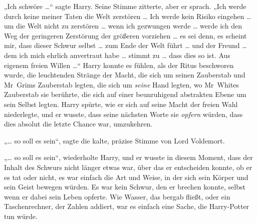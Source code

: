 „Ich schwöre …“ sagte Harry.
Seine Stimme zitterte, aber er sprach.
„Ich werde durch keine meiner Taten die Welt zerstören … Ich werde kein Risiko eingehen … um die Welt nicht zu zerstören … wenn ich gezwungen werde … werde ich den Weg der geringeren Zerstörung der größeren vorziehen … es sei denn, es scheint mir, dass dieser Schwur selbst … zum Ende der Welt führt … und der Freund … dem ich mich ehrlich anvertraut habe … stimmt zu … dass dies so ist. Aus eigenem freien Willen …“
Harry konnte es fühlen, als der Ritus beschworen wurde, die leuchtenden Stränge der Macht, die sich um seinen Zauberstab und Mr~Grims Zauberstab legten, die sich um \emph{seine} Hand legten, wo Mr~Whites Zauberstab sie berührte, die sich auf einer beunruhigend abstrakten Ebene um sein Selbst legten. Harry spürte, wie er sich auf seine Macht der freien Wahl niederlegte, und er wusste, dass seine nächsten Worte sie \emph{opfern} würden, dass dies absolut die letzte Chance war, umzukehren.

„… so soll es sein“, sagte die kalte, präzise Stimme von Lord Voldemort.

„… so soll es sein“, wiederholte Harry, und er wusste in diesem Moment, dass der Inhalt des Schwurs nicht länger etwas war, über das er entscheiden konnte, ob er es tat oder nicht, es war einfach die Art und Weise, in der sich sein Körper und sein Geist bewegen würden. Es war kein Schwur, den er brechen konnte, selbst wenn er dabei sein Leben opferte. Wie Wasser, das bergab fließt, oder ein Taschenrechner, der Zahlen addiert, war es einfach eine Sache, die Harry-Potter tun würde.

